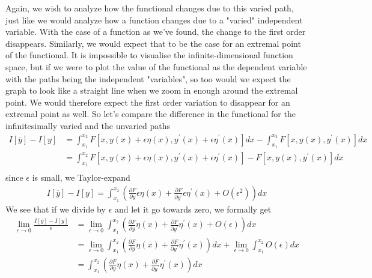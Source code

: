 \documentclass[a4paper]{article}
\begin{document}
    Again, we wish to analyze how the functional changes due to this varied path, just like we would analyze how a function changes due to a "varied" independent variable. With the case of a function as we've found, the change to the first order disappears. Similarly, we would expect that to be the case for an extremal point of the functional. It is impossible to visualise the infinite-dimensional function space, but if we were to plot the value of the functional as the dependent variable with the paths being the independent "variables", so too would we expect the graph to look like a straight line when we zoom in enough around the extremal point. We would therefore expect the first order variation to disappear for an extremal point as well. So let's compare the difference in the functional for the infinitesimally varied and the unvaried paths \begin{align*}
        I[\overline{y}] - I[y] &= \int_{x_1}^{x_2} F \left[ x, y(x) + \epsilon \eta (x), y^{\prime} (x) + \epsilon \eta ^{\prime} (x) \right]dx - \int_{x_1}^{x_2} F \left[ x, y(x), y^{\prime} (x) \right]dx \\
        &= \int_{x_1}^{x_2} F \left[ x, y(x) + \epsilon \eta (x), y^{\prime} (x) + \epsilon \eta ^{\prime} (x) \right] - F \left[ x, y(x), y^{\prime} (x) \right] dx\\
    \end{align*}
    since \(\epsilon \) is small, we Taylor-expand \begin{align*}
        I[\overline{y}] - I[y] = \int_{x_1}^{x_2} \left( \frac{\partial F}{\partial y}\epsilon \eta(x) + \frac{\partial F}{\partial y^{\prime} }\epsilon \eta^{\prime}(x) + O(\epsilon^{2})\right) dx
    \end{align*} 
    We see that if we divide by \(\epsilon\) and let it go towards zero, we formally get \begin{align*}
        \lim_{\epsilon \to 0} \frac{I[\overline{y}] - I[y]}{\epsilon} &= \lim_{\epsilon \to 0} \int_{x_1}^{x_2} \left( \frac{\partial F}{\partial y} \eta(x) + \frac{\partial F}{\partial y^{\prime} }\eta^{\prime}(x) + O(\epsilon)\right) dx\\
        &= \lim_{\epsilon \to 0} \int_{x_1}^{x_2} \left( \frac{\partial F}{\partial y} \eta(x) + \frac{\partial F}{\partial y^{\prime} }\eta^{\prime}(x)\right) dx + \lim_{\epsilon \to 0} \int_{x_1}^{x_2} O(\epsilon) dx \\
        &= \int_{x_1}^{x_2} \left( \frac{\partial F}{\partial y} \eta(x) + \frac{\partial F}{\partial y^{\prime} }\eta^{\prime}(x)\right) dx
    \end{align*} 
\end{document}
